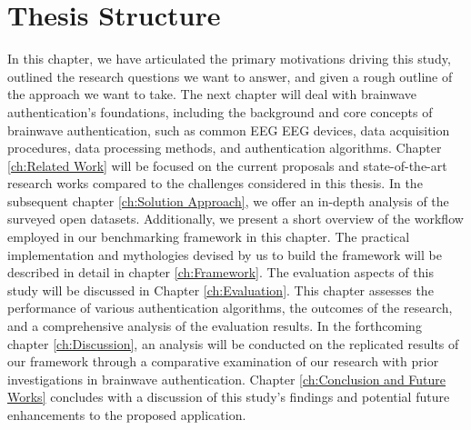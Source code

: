 \section{Thesis Structure}
\label{sec: Introduction:Thesis Structure}
In this chapter, we have articulated the primary motivations driving this study, outlined the research questions we want to answer, and given a rough outline of the approach we want to take. The next chapter will deal with brainwave authentication's foundations, including the background and core concepts of brainwave authentication, such as common EEG EEG devices, data acquisition procedures, data processing methods, and authentication algorithms. Chapter \ref{ch:Related Work} will be focused on the current proposals and state-of-the-art research works compared to the challenges considered in this thesis. In the subsequent chapter \ref{ch:Solution Approach}, we offer an in-depth analysis of the surveyed open datasets. Additionally, we present a short overview of the workflow employed in our benchmarking framework in this chapter. The practical implementation and mythologies devised by us to build the framework will be described in detail in chapter \ref{ch:Framework}. The evaluation aspects of this study will be discussed in Chapter \ref{ch:Evaluation}. This chapter assesses the performance of various authentication algorithms, the outcomes of the research, and a comprehensive analysis of the evaluation results. In the forthcoming chapter \ref{ch:Discussion}, an analysis will be conducted on the replicated results of our framework through a comparative examination of our research with prior investigations in brainwave authentication. Chapter \ref{ch:Conclusion and Future Works} concludes with a discussion of this study's findings and potential future enhancements to the proposed application.









%
